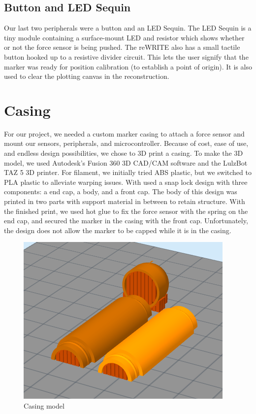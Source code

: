 \documentclass[12pt,journal]{IEEEtran}
\begin{document}
\subsection{Button and LED Sequin}
  Our last two peripherals were a button and an LED Sequin. The LED Sequin is a tiny module containing a surface-mount LED and resistor which shows whether or not the force sensor is being pushed. The reWRITE also has a small tactile button hooked up to a resistive divider circuit. This lets the user signify that the marker was ready for position calibration (to establish a point of origin). It is also used to clear the plotting canvas in the reconstruction.

\section{Casing}
  For our project, we needed a custom marker casing to attach a force sensor and mount our sensors, peripherals, and microcontroller. Because of cost, ease of use, and endless design possibilities, we chose to 3D print a casing. To make the 3D model, we used Autodesk’s Fusion 360 3D CAD/CAM software and the LulzBot TAZ 5 3D printer. For filament, we initially tried ABS plastic, but we switched to PLA plastic to alleviate warping issues. With used a snap lock design with three components: a end cap, a body, and a front cap. The body of this design was printed in two parts with support material in between to retain structure.
  With the finished print, we used hot glue to fix the force sensor with the spring on the end cap, and secured the marker in the casing with the front cap. Unfortunately, the design does not allow the marker to be capped while it is in the casing.


\begin{figure}[h]
  \centering
    \includegraphics[width=0.6\linewidth]{figures/3d-model}
  \caption{Casing model}
  \label{fig:3d-model}
\end{figure}
\end{document}
